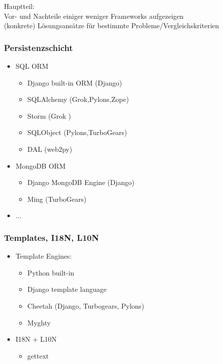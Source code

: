 \documentclass[
    t,
    smaller,
    compress,
]{beamer}
\begin{document}
\begin{frame}
Hauptteil:\\
Vor- und Nachteile einiger weniger Frameworks aufgezeigen\\
(konkrete) Lösungsansätze für bestimmte Probleme/Vergleichskriterien
\end{frame}


\begin{frame}
  \frametitle{Persistenzschicht}
  \begin{itemize}[<1->]
    \item SQL ORM
    \begin{itemize}
        \item Django built-in ORM (Django)
        \item SQLAlchemy (Grok,Pylons,Zope)
        \item Storm (Grok )
        \item SQLObject (Pylons,TurboGears)
        \item DAL (web2py)
     \end{itemize}
    \item MongoDB ORM
    \begin{itemize}[<1->]
        \item Django MongoDB Engine (Django)
        \item Ming (TurboGears)
    \end{itemize}
    \item ...
  \end{itemize}

\end{frame}


\begin{frame}
  \frametitle{Templates, I18N, L10N}
  \begin{itemize}[<1->]
    \item Template Engines:
        \begin{itemize}[<1->]
            \item Python built-in
            \item Django template language
            \item Cheetah (Django, Turbogears, Pylons)
            \item Myghty
        \end{itemize}
  \item I18N + L10N
  \begin{itemize}[<1->]
    \item gettext
   \end{itemize}
  \end{itemize}

\end{frame}
\end{document}
